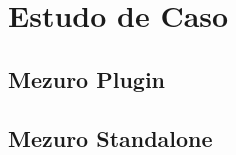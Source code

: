\chapter{Estudo de Caso}
\label{cap-estudo-caso}

\section{Mezuro Plugin}
\label{mezuro-plugin}

\section{Mezuro Standalone}
\label{mezuro-standalone}